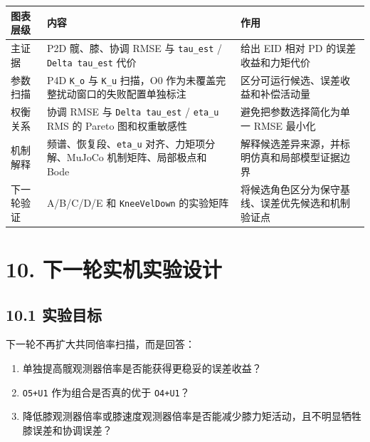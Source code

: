 \begin{longtable}[]{@{}
  >{\raggedright\arraybackslash}p{}
  >{\raggedright\arraybackslash}p{}
  >{\raggedright\arraybackslash}p{}@{}}
\toprule\noalign{}
\begin{minipage}[b]{\linewidth}\raggedright
图表层级
\end{minipage} & \begin{minipage}[b]{\linewidth}\raggedright
内容
\end{minipage} & \begin{minipage}[b]{\linewidth}\raggedright
作用
\end{minipage} \\
\midrule\noalign{}
\endhead
\bottomrule\noalign{}
\endlastfoot
主证据 & P2D 髋、膝、协调 RMSE 与 \texttt{tau\_est} / \texttt{Delta\ tau\_est} 代价 & 给出 EID 相对 PD 的误差收益和力矩代价 \\
参数扫描 & P4D \texttt{K\_o} 与 \texttt{K\_u} 扫描，O0 作为未覆盖完整扰动窗口的失败配置单独标注 & 区分可运行候选、误差收益和补偿活动量 \\
权衡关系 & 协调 RMSE 与 \texttt{Delta\ tau\_est} / \texttt{eta\_u} RMS 的 Pareto 图和权重敏感性 & 避免把参数选择简化为单一 RMSE 最小化 \\
机制解释 & 频谱、恢复段、\texttt{eta\_u} 对齐、力矩项分解、MuJoCo 机制矩阵、局部极点和 Bode & 解释候选差异来源，并标明仿真和局部模型证据边界 \\
下一轮验证 & A/B/C/D/E 和 \texttt{KneeVelDown} 的实验矩阵 & 将候选角色区分为保守基线、误差优先候选和机制验证点 \\
\end{longtable}

\section{10. 下一轮实机实验设计}\label{ux4e0bux4e00ux8f6eux5b9eux673aux5b9eux9a8cux8bbeux8ba1}

\subsection{10.1 实验目标}\label{ux5b9eux9a8cux76eeux6807}

下一轮不再扩大共同倍率扫描，而是回答：

\begin{enumerate}
\def\labelenumi{\arabic{enumi}.}
\tightlist
\item
  单独提高髋观测器倍率是否能获得更稳妥的误差收益？
\item
  \texttt{O5+U1} 作为组合是否真的优于 \texttt{O4+U1}？
\item
  降低膝观测器倍率或膝速度观测器倍率是否能减少膝力矩活动，且不明显牺牲膝误差和协调误差？
\end{enumerate}

